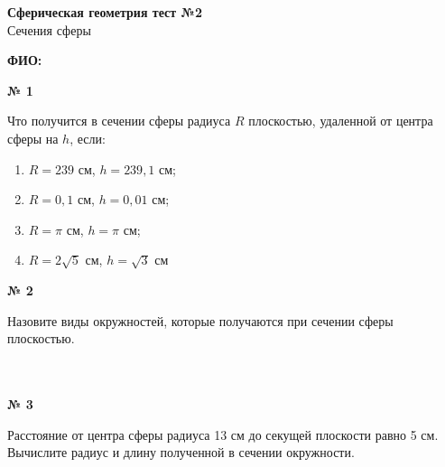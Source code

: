 


    \begin{center}
        \textbf{Сферическая геометрия тест №2}\\
        Сечения сферы
    \end{center}

    \textbf{ФИО:}

    \begin{center}
        \textbf{№ 1}
    \end{center}

    Что получится в сечении сферы радиуса $R$ плоскостью, удаленной от центра сферы на $h$, если:
    \begin{enumerate}
        \item $R = 239$ см, $h = 239,1$ см;
        \item $R = 0,1$ см, $h = 0,01$ см;
        \item $R = \pi$ см, $h = \pi$ см;
        \item $R = 2\sqrt{5}$ см, $h = \sqrt{3}$ см
    \end{enumerate}

    \begin{center}
        \textbf{№ 2}
    \end{center}

    Назовите виды окружностей, которые получаются при сечении сферы плоскостью.
    \\ \ \\ \ \\

    \begin{center}
        \textbf{№ 3}
    \end{center}

     Расстояние от центра сферы радиуса 13 см до секущей плоскости равно 5 см.
    Вычислите радиус и длину полученной в сечении окружности.


